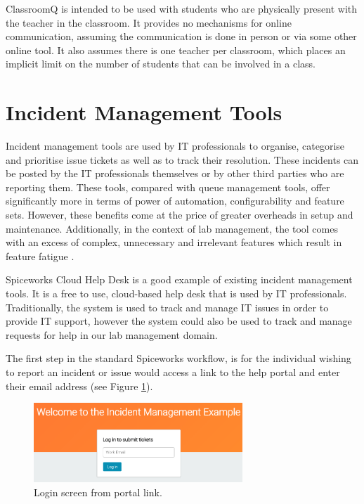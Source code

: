 ClassroomQ is intended to be used with students who are physically present with the teacher in the classroom. It provides no mechanisms for online communication, assuming the communication is done in person or via some other online tool. It also assumes there is one teacher per classroom, which places an implicit limit on the number of students that can be involved in a class.

\newpage
\section{Incident Management Tools}

Incident management tools are used by IT professionals to organise, categorise and prioritise issue tickets as well as to track their resolution. These incidents can be posted by the IT professionals themselves or by other third parties who are reporting them. These tools, compared with queue management tools, offer significantly more in terms of power of automation, configurability and feature sets. However, these benefits come at the price of greater overheads in setup and maintenance. Additionally, in the context of lab management, the tool comes with an excess of complex, unnecessary and irrelevant features which result in feature fatigue \cite{ffatigue}.

Spiceworks Cloud Help Desk \cite{spiceworks} is a good example of existing incident management tools. It is a free to use, cloud-based help desk that is used by IT professionals. Traditionally, the system is used to track and manage IT issues in order to provide IT support, however the system could also be used to track and manage requests for help in our lab management domain. 

The first step in the standard Spiceworks workflow, is for the individual wishing to report an incident or issue would access a link to the help portal and enter their email address (see Figure \ref{fig:spiceemail}).

\FloatBarrier
\begin{figure}[H]
  \centering
  \includegraphics[width=0.7\textwidth]{2context/images/SWportalLogin.png}
  \caption{Login screen from portal link.}
  \label{fig:spiceemail}
\end{figure}

